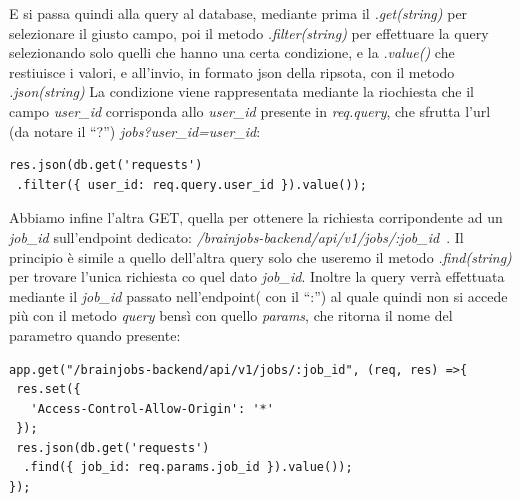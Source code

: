 \documentclass[a4paper,12pt, oneside]{book}
\begin{document}
E si passa quindi alla query al database, mediante prima il \textit{.get(string)}
per selezionare il giusto campo, poi il metodo \textit{.filter(string)} per effettuare
la query selezionando solo quelli che hanno una certa condizione, e la \textit{.value()}
che restiuisce i valori, e all'invio, in formato json della ripsota, con il metodo \textit{.json(string)}
La condizione viene rappresentata mediante la riochiesta che il campo \textit{user\_id} corrisponda allo \textit{user\_id} presente in \textit{req.query}, che sfrutta l'url (da notare il ``?'') \textit{jobs?user\_id=user\_id}:
\begin{shaded} 
\begin{verbatim}
res.json(db.get('requests')
 .filter({ user_id: req.query.user_id }).value());
\end{verbatim}
\end{shaded}
Abbiamo infine l'altra GET, quella per ottenere la richiesta corripondente ad un \textit{job\_id}
sull'endpoint dedicato: \textit{/brainjobs-backend/api/v1/jobs/:job\_id\
}. Il principio
è simile a quello dell'altra query solo che useremo il metodo \textit{.find(string)}
per trovare l'unica richiesta co quel dato \textit{job\_id}. Inoltre la query verrà
effettuata mediante il \textit{job\_id} passato nell'endpoint( con il ``:'') al quale
quindi non si accede più con il metodo \textit{query} bensì con quello \textit{params}, che ritorna il nome del parametro quando presente:

\begin{shaded} 
\begin{verbatim}
app.get("/brainjobs-backend/api/v1/jobs/:job_id", (req, res) =>{    
 res.set({
   'Access-Control-Allow-Origin': '*'
 });
 res.json(db.get('requests')
  .find({ job_id: req.params.job_id }).value());  
});
\end{verbatim}
\end{shaded}
\end{document}
